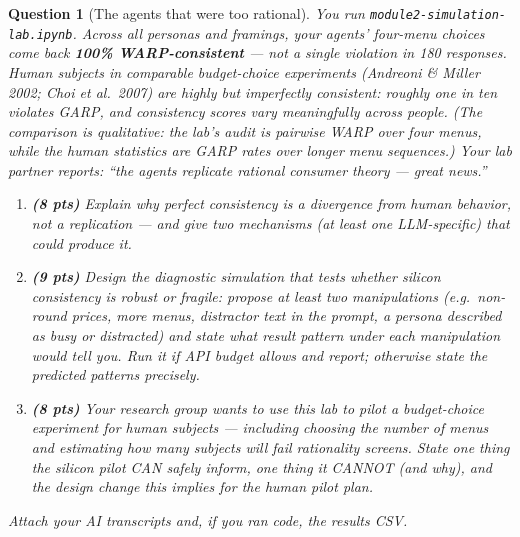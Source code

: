 \documentclass[11pt]{article}
\newtheorem{question}{Question}
\begin{document}
\begin{question}[The agents that were too rational]
You run \texttt{module2-simulation-lab.ipynb}. Across all personas and
framings, your agents' four-menu choices come back \textbf{100\%
WARP-consistent} --- not a single violation in 180 responses. Human
subjects in comparable budget-choice experiments (Andreoni \& Miller 2002;
Choi et al.\ 2007) are highly but \emph{imperfectly} consistent: roughly
one in ten violates GARP, and consistency scores vary meaningfully across
people. (The comparison is qualitative: the lab's audit is pairwise WARP
over four menus, while the human statistics are GARP rates over longer
menu sequences.) Your lab partner reports: ``the agents replicate rational
consumer theory --- great news.''

\begin{enumerate}[label=(\alph*)]
  \item \textbf{(8 pts)} Explain why perfect consistency is a
        \emph{divergence} from human behavior, not a replication ---
        and give two mechanisms (at least one LLM-specific) that could
        produce it.
  \item \textbf{(9 pts)} Design the diagnostic simulation that tests
        whether silicon consistency is robust or fragile: propose at least
        two manipulations (e.g.\ non-round prices, more menus, distractor
        text in the prompt, a persona described as busy or distracted) and
        state what result pattern under each manipulation would tell you.
        Run it if API budget allows and report; otherwise state the
        predicted patterns precisely.
  \item \textbf{(8 pts)} Your research group wants to use this lab to
        pilot a budget-choice experiment for human subjects --- including
        choosing the number of menus and estimating how many subjects
        will fail rationality screens. State one thing the silicon pilot
        CAN safely inform, one thing it CANNOT (and why), and the design
        change this implies for the human pilot plan.
\end{enumerate}
Attach your AI transcripts and, if you ran code, the results CSV.
\end{question}
\end{document}
